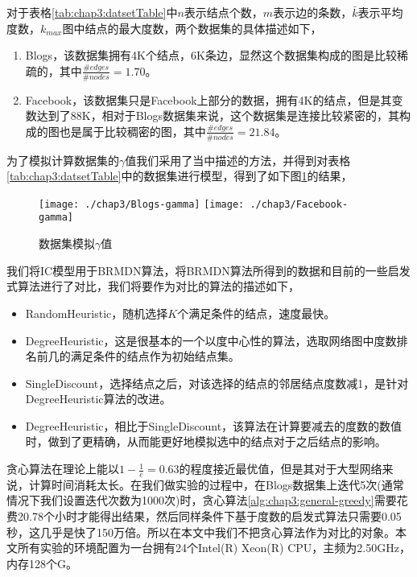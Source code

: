 对于表格\ref{tab:chap3:datsetTable}中$n$表示结点个数，$m$表示边的条数，$\bar{k}$表示平均度数，$k_{max}$图中结点的最大度数，两个数据集的具体描述如下，
\begin{enumerate}
\item Blogs\cite{hu2013newACN}，该数据集拥有4K个结点，6K条边，显然这个数据集构成的图是比较稀疏的，其中$\frac{\#edges}{\#nodes}=1.70$。
\item Facebook\cite{leskovec2012learning}，该数据集只是Facebook上部分的数据，拥有4K的结点，但是其变数达到了88K，相对于Blogs数据集来说，这个数据集是连接比较紧密的，其构成的图也是属于比较稠密的图，其中$\frac{\#edges}{\#nodes}=21.84$。
\end{enumerate}

为了模拟计算数据集的$\gamma$值我们采用了\cite{hu2015rmdn}当中描述的方法，并得到对表格\ref{tab:chap3:datsetTable}中的数据集进行模型，得到了如下图\ref{fig:blogs-facebook-gamma}的结果，

\begin{figure}[H]
\centering%
	{\texttt{[image: ./chap3/Blogs-gamma]}}
	\hspace{1mm}%
	{\texttt{[image: ./chap3/Facebook-gamma]}}
	\caption{数据集模拟$\gamma$值}
	\label{fig:blogs-facebook-gamma}
\end{figure}


我们将IC模型用于BRMDN算法，将BRMDN算法所得到的数据和目前的一些启发式算法进行了对比，我们将要作为对比的算法的描述如下，
\begin{itemize}
\item RandomHeuristic，随机选择$K$个满足条件的结点，速度最快。
\item DegreeHeuristic，这是很基本的一个以度中心性的算法，选取网络图中度数排名前几的满足条件的结点作为初始结点集。
\item SingleDiscount，选择结点之后，对该选择的结点的邻居结点度数减1，是针对DegreeHeuristic算法的改进。
\item DegreeHeuristic，相比于SingleDiscount，该算法在计算要减去的度数的数值时，做到了更精确，从而能更好地模拟选中的结点对于之后结点的影响。
\end{itemize}


贪心算法在理论上能以$1-\frac{1}{e}=0.63$的程度接近最优值，但是其对于大型网络来说，计算时间消耗太长。在我们做实验的过程中，在Blogs数据集上迭代5次(通常情况下我们设置迭代次数为1000次)时，贪心算法\ref{alg:chap3:general-greedy}需要花费20.78个小时才能得出结果，然后同样条件下基于度数的启发式算法只需要0.05秒，这几乎是快了150万倍。所以在本文中我们不把贪心算法作为对比的对象。本文所有实验的环境配置为一台拥有24个Intel(R) Xeon(R) CPU，主频为2.50GHz，内存128个G。

